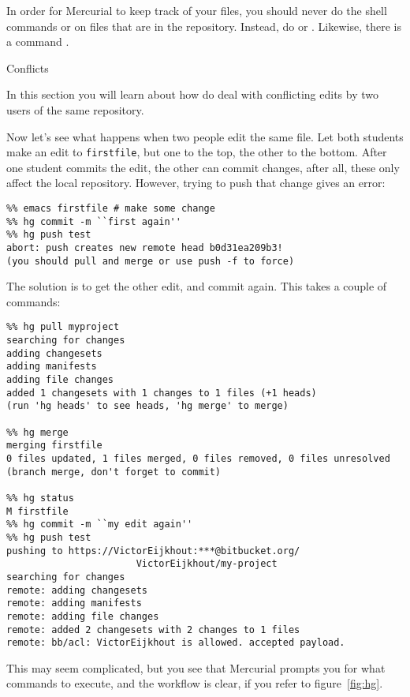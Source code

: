 
In order for Mercurial to keep track of your files, you should never do
the shell commands
 or  on files that are in the repository. Instead, do
 or . Likewise, there is a command .

 {Conflicts}

\begin{purpose}
  In this section you will learn about how do deal with conflicting
  edits by two users of the same repository.
\end{purpose}

Now let's see what happens when two people edit the same file.
Let both students make an edit to \verb+firstfile+, but one to the
top, the other to the bottom. After one student commits the edit, the
other can commit changes, after all, these only affect the local repository.
However, trying to push that change gives an error:
\begin{verbatim}
%% emacs firstfile # make some change
%% hg commit -m ``first again''
%% hg push test
abort: push creates new remote head b0d31ea209b3!
(you should pull and merge or use push -f to force)
\end{verbatim}
The solution is to get the other edit, and commit again. This takes a 
couple of commands:
{\small
\begin{verbatim}
%% hg pull myproject
searching for changes
adding changesets
adding manifests
adding file changes
added 1 changesets with 1 changes to 1 files (+1 heads)
(run 'hg heads' to see heads, 'hg merge' to merge)

%% hg merge
merging firstfile
0 files updated, 1 files merged, 0 files removed, 0 files unresolved
(branch merge, don't forget to commit)

%% hg status
M firstfile
%% hg commit -m ``my edit again''
%% hg push test
pushing to https://VictorEijkhout:***@bitbucket.org/
                       VictorEijkhout/my-project
searching for changes
remote: adding changesets
remote: adding manifests
remote: adding file changes
remote: added 2 changesets with 2 changes to 1 files
remote: bb/acl: VictorEijkhout is allowed. accepted payload.
\end{verbatim}
}

This may seem complicated, but you see that Mercurial prompts you 
for what commands to execute, and the workflow is clear, if you refer
to figure~\ref{fig:hg}.

